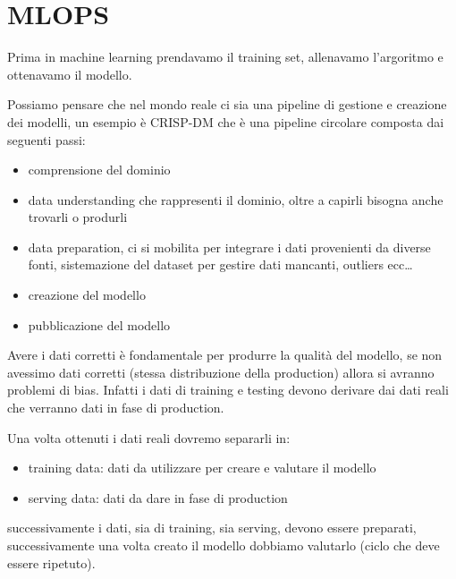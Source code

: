 \chapter{MLOPS}
Prima in machine learning  prendavamo il training set, allenavamo l'argoritmo e 
ottenavamo il modello.

Possiamo pensare che nel mondo reale ci sia una pipeline di gestione e creazione 
dei modelli, un esempio è CRISP-DM che è una pipeline circolare composta 
dai seguenti passi:
\begin{itemize}
    \item comprensione del dominio
    \item data understanding che rappresenti il dominio, oltre a capirli bisogna 
    anche trovarli o produrli
    \item data preparation, ci si mobilita per integrare i dati provenienti da 
    diverse fonti, sistemazione del dataset per gestire dati mancanti, outliers ecc\dots
    \item creazione del modello
    \item pubblicazione del modello
\end{itemize}


Avere i dati corretti è fondamentale per produrre la qualità del modello, se non avessimo
dati corretti (stessa distribuzione della production) allora si avranno problemi 
di bias. Infatti i dati di training e testing devono derivare dai dati reali che verranno 
dati in fase di production.

Una volta ottenuti i dati reali dovremo separarli in:
\begin{itemize}
    \item training data: dati da utilizzare per creare e valutare il modello
    \item serving data: dati da dare in fase di production
\end{itemize}

successivamente i dati, sia di training, sia serving, devono essere preparati,
successivamente una volta creato il modello dobbiamo valutarlo (ciclo che deve essere
ripetuto). 

